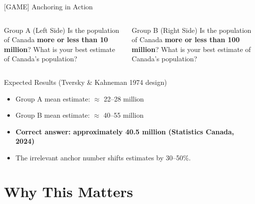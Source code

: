 \documentclass[aspectratio=169]{beamer}
\begin{document}
\begin{frame}{[GAME] Anchoring in Action}
\begin{columns}
\begin{block}{Group A (Left Side)}
Is the population of Canada \textbf{more or less than 10 million}? What is your best estimate of Canada's population?
\end{block}
\begin{alertblock}{Group B (Right Side)}
Is the population of Canada \textbf{more or less than 100 million}? What is your best estimate of Canada's population?
\end{alertblock}
\end{columns}
\medskip
\begin{block}{Expected Results (Tversky \& Kahneman 1974 design)}
\begin{itemize}
  \item Group A mean estimate: $\approx$ 22--28 million
  \item Group B mean estimate: $\approx$ 40--55 million
  \item \textbf{Correct answer: approximately 40.5 million (Statistics Canada, 2024)}
  \item The \alert{irrelevant} anchor number shifts estimates by 30--50\%.
\end{itemize}
\end{block}
\end{frame}

\section{Why This Matters}
\end{document}
